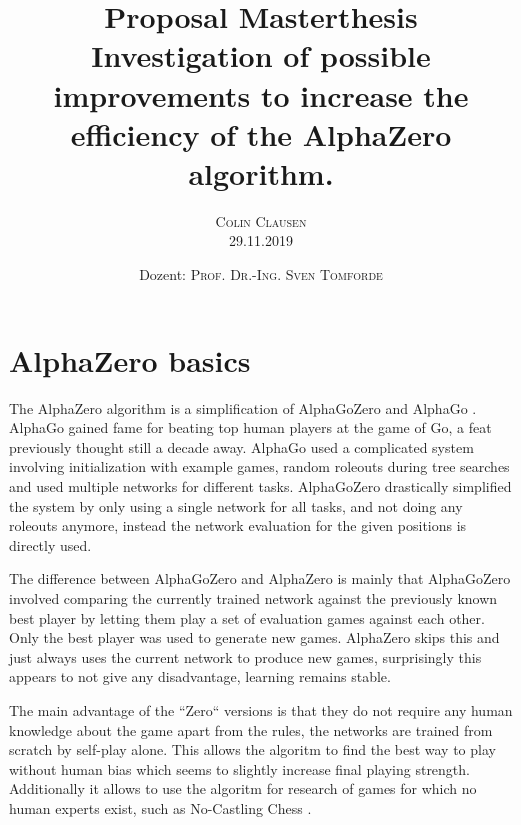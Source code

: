 \documentclass[12pt,onecolumn,oneside,titlepage]{article}
\begin{document}
\title{\bfseries {\Large Proposal Masterthesis}\\[2cm]
      Investigation of possible improvements to increase the efficiency of the AlphaZero algorithm.}

\author{\textsc{Colin Clausen}\\[1cm]
        29.11.2019\\[3cm]}

\date{Dozent: \textsc{Prof. Dr.-Ing. Sven Tomforde}}


\maketitle
\setcounter{tocdepth}{3}  %
\tableofcontents
\newpage

\section{AlphaZero basics}

The AlphaZero algorithm \cite{silver2018general} is a simplification of AlphaGoZero \cite{silver2017mastering} and AlphaGo \cite{silver2016mastering}. AlphaGo gained fame for beating top human players at the game of Go, a feat previously thought still a decade away.
AlphaGo used a complicated system involving initialization with example games, random roleouts during tree searches and used multiple networks for different tasks. AlphaGoZero drastically simplified the system by only using a single network for all tasks,
and not doing any roleouts anymore, instead the network evaluation for the given positions is directly used.

The difference between AlphaGoZero and AlphaZero is mainly that AlphaGoZero involved comparing the currently trained network against the previously known best player by letting them play a set of evaluation games against each other.
Only the best player was used to generate new games. AlphaZero skips this and just always uses the current network to produce new games, surprisingly this appears to not give any disadvantage, learning remains stable.

The main advantage of the ``Zero`` versions is that they do not require any human knowledge about the game apart from the rules, the networks are trained from scratch by self-play alone.
This allows the algoritm to find the best way to play without human bias which seems to slightly increase final playing strength.
Additionally it allows to use the algoritm for research of games for which no human experts exist, such as No-Castling Chess \cite{NoCastleChess}.
\end{document}
